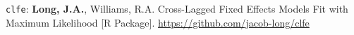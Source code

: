 \documentclass[margin,line]{res}
\newenvironment{list2}{
  \begin{list}{$\bullet$}{%
      \setlength{\itemsep}{0in}
      \setlength{\parsep}{0in} \setlength{\parskip}{0in}
      \setlength{\topsep}{0in} \setlength{\partopsep}{0in} 
      \setlength{\leftmargin}{0.2in}}}{\end{list}}
\begin{document}
\begin{resume}
\texttt{clfe}: {\bf Long, J.A.}, Williams, R.A. Cross-Lagged Fixed Effects Models Fit with Maximum Likelihood [R Package]. \url{https://github.com/jacob-long/clfe}




\end{resume}
\end{document}
